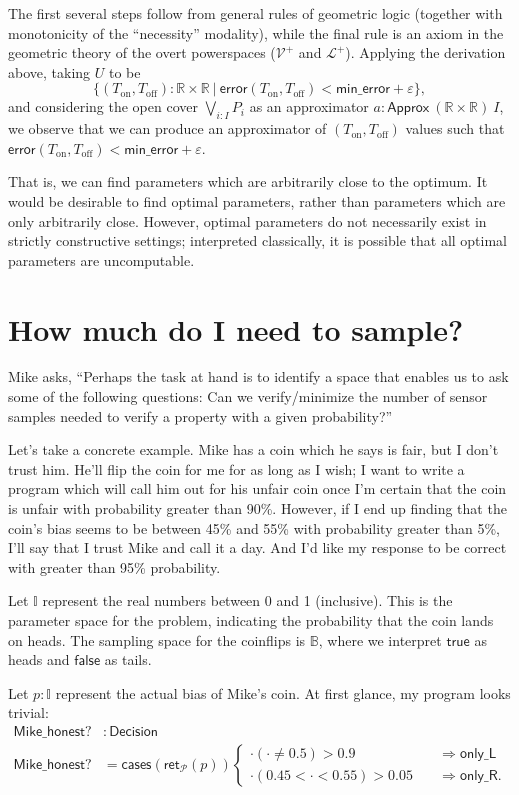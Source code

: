 \documentclass{article}           %
\newcommand{\R}{\mathbb{R}}
\newcommand{\suchthat}{\ |\ }
\newcommand{\bool}{\mathbb{B}}
\newcommand{\Prob}{\mathcal{P}}
\newcommand{\PLower}{\mathcal{L}^+}
\newcommand{\Viet}{{\mathcal{V}^+}}
\newcommand{\ret}[1]{\mathsf{ret}_{#1}}
\begin{document}
The first several steps follow from general rules of geometric logic (together with monotonicity of the ``necessity'' modality), while the final rule is an axiom in the geometric theory of the overt powerspaces ($\Viet$ and $\PLower$). Applying the derivation above, taking $U$ to be
\[
\{ (T_\text{on}, T_\text{off}) : \R \times \R \suchthat \mathsf{error}(T_\text{on}, T_\text{off}) < \mathsf{min\_error} + \varepsilon \},
\]
and considering the open cover $\bigvee_{i : I} P_i$ as an approximator $a : \mathsf{Approx}\ (\R \times \R)\ I$, we observe that we can produce an approximator of $(T_\text{on}, T_\text{off})$ values such that $\mathsf{error}(T_\text{on}, T_\text{off})  < \mathsf{min\_error} + \varepsilon$.

That is, we can find parameters which are arbitrarily close to the optimum. It would be desirable to find optimal parameters, rather than parameters which are only arbitrarily close. However, optimal parameters do not necessarily exist in strictly constructive settings; interpreted classically, it is possible that all optimal parameters are uncomputable.

\section{How much do I need to sample?}

Mike asks, ``Perhaps the task at hand is to identify a space that enables us to ask
some of the following questions: Can we verify/minimize the number of sensor samples needed to verify a property with a given probability?''

Let's take a concrete example. Mike has a coin which he says is fair, but I don't trust him. He'll flip the coin for me for as long as I wish; I want to write a program which will call him out for his unfair coin once I'm certain that the coin is unfair with probability greater than 90\%. However, if I end up finding that the coin's bias seems to be between 45\% and 55\% with probability greater than 5\%, I'll say that I trust Mike and call it a day. And I'd like my response to be correct with greater than 95\% probability.

Let $\mathbb{I}$ represent the real numbers between 0 and 1 (inclusive). This is the parameter space for the problem, indicating the probability that the coin lands on heads. The sampling space for the coinflips is $\bool$, where we interpret $\mathsf{true}$ as heads and $\mathsf{false}$ as tails.

Let $p : \mathbb{I}$ represent the actual bias of Mike's coin. At first glance, my program looks trivial:
\begin{align*}
\mathsf{Mike\_honest?} &: \mathsf{Decision}
\\ \mathsf{Mike\_honest?} &= \mathsf{cases}(\ret{\Prob}(p))
\begin{cases}
\cdot(\cdot \ne 0.5) > 0.9
  \quad &\Longrightarrow
   \mathsf{only\_L}
\\
\cdot(0.45 < \cdot < 0.55) > 0.05
  \quad &\Longrightarrow
   \mathsf{only\_R}.
\end{cases}
\end{align*}
\end{document}
